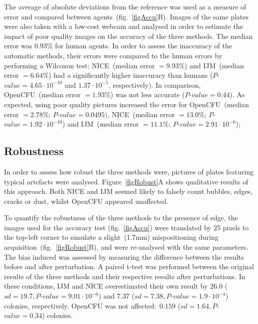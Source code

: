 \documentclass[10pt]{article}
\newcommand{\IJM}{IJM}
\newcommand{\EdgeNoiseOCFU}{$0.159$ ($sd=1.64, P$-$value=0.34$)}
\newcommand{\EdgeNoiseIJM}{$26.0$ ($sd=19.7, P$-$value=9.01\cdot 10^{-6}$)}
\newcommand{\EdgeNoiseNICE}{$7.37$ ($sd=7.38,P$-$value=1.9\cdot 10^{-4}$)}
\begin{document}
The average of absolute deviations from the reference was used
as a measure of error and compared between agents~(fig.~\ref{figAccu}B).
Images of the same plates were also taken with a low-cost webcam and analysed in
order to estimate the impact of poor quality images on the accuracy of the three
methods.
The median error was $0.93\%$ for human agents. In order to assess the
inaccuracy of the automatic methods, their errors were compared to the human
errors by performing a Wilcoxon test:
NICE~(median error $= 9.93\%$) and \IJM{}~(median error $= 6.64\%$) had a significantly higher inaccuracy than
humans ($P$-$value = 4.65\cdot 10^{-10}$ and $1.37\cdot 10^{-5}$, respectively).
In comparison, OpenCFU~(median error $= 1.93\%$) was not less accurate ($P$-$value = 0.44$).
As expected, using poor quality pictures increased the error for OpenCFU~(median error $= 2.78\%$; $P$-$value =
0.0495$), NICE~(median error $= 13.0\%$; $P$-$value = 1.92 \cdot 10^{-10}$) and \IJM{}~(median error $= 11.1\%$; $P$-$value = 2.91 \cdot 10^{-6} $);

\subsection*{Robustness} 
In order to assess how robust the three methods were,
pictures of plates featuring typical artefacts were analysed.
Figure~\ref{figRobust}A shows qualitative results of this approach.
Both NICE and \IJM{} seemed likely to falsely count bubbles, edges, cracks or
dust, whilst OpenCFU appeared unaffected.

To quantify the robustness of the three methods to the presence of edge, the
images used for the accuracy test (fig.~\ref{figAccu}) were translated by 25 pixels to the top-left
corner to simulate a slight~(1.7mm) mispositioning during
acquisition~(fig.~\ref{figRobust}B), and were re-analysed with the same
parameters.
The bias induced was assessed by measuring the difference between the results
before and after perturbation. A paired t-test was performed between the
original results of the three methods and their respective results after perturbations.
In these conditions, \IJM{} and NICE overestimated their own result by
\EdgeNoiseIJM{} and \EdgeNoiseNICE{} colonies, respectively. OpenCFU was not affected:~\EdgeNoiseOCFU{} colonies.
\end{document}
